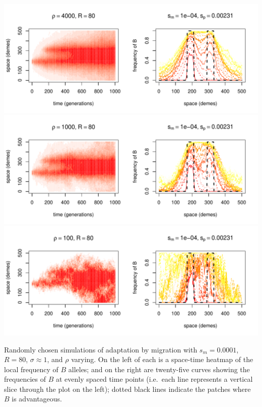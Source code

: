 \documentclass{article}
\newcommand{\includereviews}{}
\begin{document}
\begin{sfigure}
  \begin{center}
    \includegraphics{example-migration-sims/26044-r1-501-sb0_01-sm-1e-04-N4000-pophistory-run}
    \includegraphics{example-migration-sims/85750-r1-501-sb0_01-sm-1e-04-N1000-pophistory-run}
    \includegraphics{example-migration-sims/4111-r1-501-sb0_01-sm-1e-04-N100-pophistory-run}
  \end{center}
  \caption{
    Randomly chosen simulations of adaptation by migration
    with $s_m=0.0001$, $R=80$, $\sigma\approx 1$, and $\rho$ varying.
    On the left of each is a space-time heatmap of the local frequency of $B$ alleles;
    and on the right are twenty-five curves showing the frequencies of $B$ at evenly spaced time points
    (i.e.\ each line represents a vertical slice through the plot on the left);
    dotted black lines indicate the patches where $B$ is advantageous.
  } \label{sfig:sims_8}
\end{sfigure}






\includereviews
\end{document}
